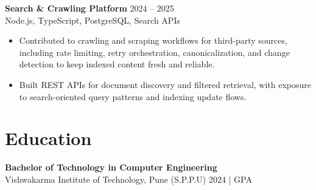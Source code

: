 \documentclass[10pt,letterpaper]{article}
\newcommand{\resumeSubheading}[4]{%
  \textbf{#1} \hfill #2 \\
  #3 \hfill #4 \\
}
\begin{document}
\resumeSubheading{Search \& Crawling Platform}{2024 -- 2025}{}{Node.js, TypeScript, PostgreSQL, Search APIs}
\begin{itemize}
    \item Contributed to crawling and scraping workflows for third-party sources, including rate limiting, retry orchestration, canonicalization, and change detection to keep indexed content fresh and reliable.
    \item Built REST APIs for document discovery and filtered retrieval, with exposure to search-oriented query patterns and indexing update flows.
\end{itemize}

\section*{Education}
\resumeSubheading{Bachelor of Technology in Computer Engineering}{}{Vishwakarma Institute of Technology, Pune (S.P.P.U)}{2024 \enspace | \enspace 8.8 GPA}
\end{document}
